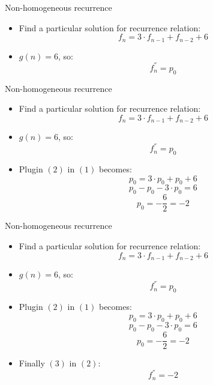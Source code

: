 \documentclass{beamer}
\begin{document}
\begin{frame}{Non-homogeneous recurrence}
    \begin{itemize}
        \item Find a particular solution for recurrence relation:
            \begin{equation}\tag{1}
                f_n = 3 \cdot f_{n-1} + f_{n-2} + 6
            \end{equation}
        \item $g(n) = 6$, so:
            \begin{equation}\tag{2}
                f_n^{''} = p_0
            \end{equation}
    \end{itemize}
\end{frame}

\begin{frame}{Non-homogeneous recurrence}
    \begin{itemize}
        \item Find a particular solution for recurrence relation:
            \begin{equation}\tag{1}
                f_n = 3 \cdot f_{n-1} + f_{n-2} + 6
            \end{equation}
        \item $g(n) = 6$, so:
            \begin{equation}\tag{2}
                f_n^{''} = p_0
            \end{equation}
        \item Plugin $(2)$ in $(1)$ becomes: 
            $$ p_0 = 3 \cdot p_0 + p_0 + 6 $$
            $$ p_0 - p_0 - 3 \cdot p_0 = 6 $$
            \begin{equation}\tag{3}
                p_0 = - \frac{6}{2} =  -2
            \end{equation}
    \end{itemize}
\end{frame}

\begin{frame}{Non-homogeneous recurrence}
    \begin{itemize}
        \item Find a particular solution for recurrence relation:
            \begin{equation}\tag{1}
                f_n = 3 \cdot f_{n-1} + f_{n-2} + 6
            \end{equation}
        \item $g(n) = 6$, so:
            \begin{equation}\tag{2}
                f_n^{''} = p_0
            \end{equation}
        \item Plugin $(2)$ in $(1)$ becomes: 
            $$ p_0 = 3 \cdot p_0 + p_0 + 6 $$
            $$ p_0 - p_0 - 3 \cdot p_0 = 6 $$
            \begin{equation}\tag{3}
                p_0 = - \frac{6}{2} =  -2
            \end{equation}
        \item Finally $(3)$ in $(2)$:
        $$ f_n^{''} = -2 $$
    \end{itemize}
\end{frame}
\end{document}

